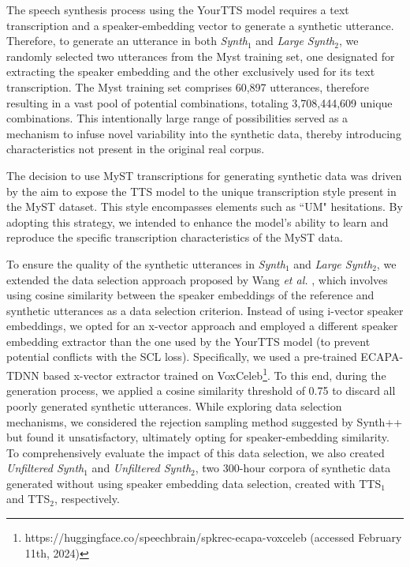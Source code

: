 The speech synthesis process using the YourTTS model requires a text transcription and a speaker-embedding vector to generate a synthetic utterance. Therefore, to generate an utterance in both \textit{Synth$_1$} and \textit{Large Synth$_2$}, we randomly selected two utterances from the Myst training set, one designated for extracting the speaker embedding and the other exclusively used for its text transcription. The Myst training set comprises 60,897 utterances, therefore resulting in a vast pool of potential combinations, totaling 3,708,444,609 unique combinations. This intentionally large range of possibilities served as a mechanism to infuse novel variability into the synthetic data, thereby introducing characteristics not present in the original real corpus.

The decision to use MyST transcriptions for generating synthetic data was driven by the aim to expose the \ac{TTS} model to the unique transcription style present in the MyST dataset. This style encompasses elements such as ``UM" hesitations. By adopting this strategy, we intended to enhance the model's ability to learn and reproduce the specific transcription characteristics of the MyST data.

To ensure the quality of the synthetic utterances in \textit{Synth$_1$} and \textit{Large Synth$_2$}, we extended the data selection approach proposed by Wang \textit{et al.} \cite{wang2021towards}, which involves using cosine similarity between the speaker embeddings of the reference and synthetic utterances as a data selection criterion. Instead of using i-vector speaker embeddings, we opted for an x-vector approach and employed a different speaker embedding extractor than the one used by the YourTTS model (to prevent potential conflicts with the \ac{SCL} loss). Specifically, we used a pre-trained ECAPA-TDNN \cite{desplanques20_interspeech} based x-vector extractor trained on VoxCeleb\footnote{https://huggingface.co/speechbrain/spkrec-ecapa-voxceleb (accessed February 11th, 2024)}. To this end, during the generation process, we applied a cosine similarity threshold of 0.75 to discard all poorly generated synthetic utterances. While exploring data selection mechanisms, we considered the rejection sampling method suggested by Synth++ \cite{hu2022synt++} but found it unsatisfactory, ultimately opting for speaker-embedding similarity. To comprehensively evaluate the impact of this data selection, we also created \textit{Unfiltered Synth$_1$} and \textit{Unfiltered Synth$_2$}, two 300-hour corpora of synthetic data generated without using speaker embedding data selection, created with TTS$_1$ and TTS$_2$, respectively.


